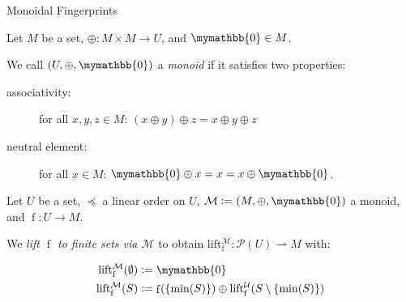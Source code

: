 \documentclass{beamer}
\newcommand{\defined}[1]{\textit{#1}}
\newcommand{\defeq}{\vcentcolon=}
\newcommand{\neutraladd}[0]{\mymathbb{0}}
\newcommand{\groupaddsym}[0]{\oplus}
\newcommand{\groupadd}[2]{{#1} \groupaddsym {#2}}
\newcommand{\fun}[3]{{#1}: {#2} \rightarrow {#3}}
\newcommand{\partialfun}[3]{{#1}: {#2} \rightharpoonup{#3}}
\newcommand{\set}[1]{\{#1\}}
\newcommand{\powerset}[1]{\mathcal{P}({#1})}
\DeclareMathOperator{\f}{f}
\newcommand{\lift}[2]{\operatorname{lift_{#1}^{#2}}}
\begin{document}
\begin{frame}{Monoidal Fingerprints}
\begin{definition}
Let $M$ be a set, $\groupaddsym: M \times M \rightarrow U$, and $\neutraladd \in M$.

We call $(U, \groupaddsym, \neutraladd)$ a \defined{monoid} if it satisfies two properties:

  \begin{description}
    \item[associativity:] for all $x, y, z \in M$: $\groupadd{(\groupadd{x}{y})}{z} = \groupadd{x}{\groupadd{y}{z}}$
    \item[neutral element:] for all $x \in M$: $\groupadd{\neutraladd}{x} = x = \groupadd{x}{\neutraladd}$.
  \end{description}
\end{definition}

\pause

\begin{definition}
\label{def-lift}
Let $U$ be a set, $\preceq$ a linear order on $U$, $\mathcal{M} \defeq (M, \groupaddsym, \neutraladd)$ a monoid, and $\fun{\f}{U}{M}$.

We \defined{lift $\f$ to finite sets via $\mathcal{M}$} to obtain $\partialfun{\lift{\f}{\mathcal{M}}}{\powerset{U}}{M}$ with:

\vspace{-1.0cm}
\begin{align*}
\lift{\f}{\mathcal{M}}(\emptyset) &\defeq \mymathbb{0}\\
\lift{\f}{\mathcal{M}}(S) &\defeq \f(\set{\min(S)}) \oplus \lift{\f}{\mathcal{U}}(S \setminus \set{\min(S)})\\
\end{align*}
\end{definition}
\end{frame}
\end{document}

